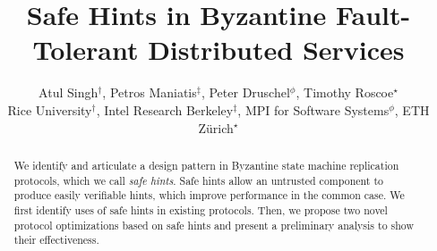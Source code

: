 \documentclass[twocolumn,10pt]{article}
\date{}
\begin{document}
\newtheorem{theorem}{Theorem}
\newtheorem{lemma}{Lemma}
\newtheorem{definition}{Definition}

\newcommand{\bihq}{BI-HQ\xspace}
\newcommand{\msg}[1]{\ensuremath{\textsc{#1}}}
\newcommand{\note}[1]{[\textcolor{red}{\textit{#1}}]}
\newcommand{\stitle}[1]{\vspace{2pt}{\bf #1:}}
\newcommand{\priority}[1]{[\textcolor{blue}{\textbf{#1}}]}

\newcommand{\reportsubmission}[2]{#2}




\title{Safe Hints in
Byzantine Fault-Tolerant Distributed Services}
\author{Atul Singh$^{\dag}$,
Petros Maniatis$^{\ddag}$, 
Peter Druschel$^{\phi}$,
Timothy Roscoe$^{\star}$
\\
Rice University$^{\dag}$, Intel Research Berkeley$^{\ddag}$, MPI for
Software Systems$^{\phi}$, ETH Z\"urich$^{\star}$}

 \let\oldthebibliography=\thebibliography
 \let\endoldthebibliography=\endthebibliography
 \renewenvironment{thebibliography}[1]{%
     \begin{oldthebibliography}{#1}%
     \setlength{\parskip}{0ex}%
     \setlength{\itemsep}{0ex}%
 }%
 {%
     \end{oldthebibliography}%
 }



\maketitle
\begin{abstract}
We identify and articulate a design pattern in Byzantine state machine
replication protocols, which we call \emph{safe hints}. Safe hints
allow an untrusted component to produce easily verifiable hints, which
improve performance in the common case. We first identify uses of safe
hints in existing protocols. Then, we propose two novel protocol
optimizations based on safe hints and present a preliminary analysis
to show their effectiveness.
\end{abstract}
\end{document}
